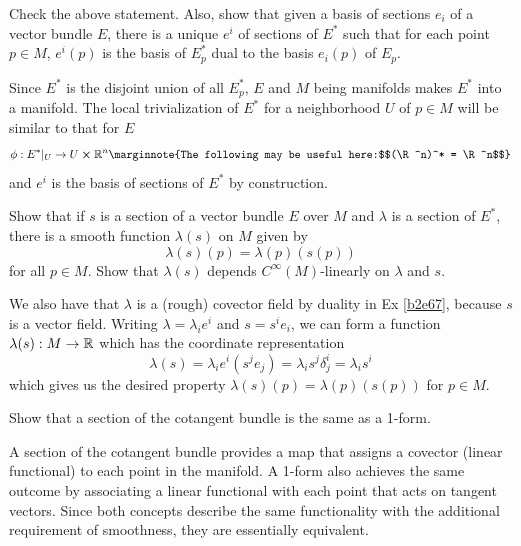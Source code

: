 \documentclass[10pt]{article}
\begin{document}
\begin{example}\label{b2e67}
	Check the above statement. Also, show that given a basis of sections $e_i$ of a vector bundle $E$, there is a unique  $e^i$ of sections of $E^*$ such that for each point $p \in M$, $e^i(p)$ is the basis of $E^*_p$ dual to the basis $e_i(p)$ of $E_p$.
\end{example}
\sol Since $E^*$ is the disjoint union of all $E_p^*$, $E$ and $M$ being manifolds makes $E^*$ into a manifold. The local trivialization of $E^*$ for a neighborhood $U$ of $p \in M$ will be similar to that for $E$
$$
\phi:E^*|_U \to U \cross \R^n\marginnote{The following may be useful here:$$(\R^n)^* = \R^n$$}
$$
and $e^i$ is the basis of sections of $E^*$ by construction.


\begin{example}
	Show that if $s$ is a section of a vector bundle $E$ over $M$ and $\lambda$ is a section of $E^*$, there is a smooth function $\lambda(s)$ on $M$ given by
	$$
	\lambda(s)(p) = \lambda(p)(s(p))
	$$
	for all $p\in M$. Show that $\lambda(s)$ depends $C^\infty(M)$-linearly on $\lambda$ and $s$.
\end{example}
\sol We also have that $\lambda$ is a (rough) covector field by duality in Ex \ref{b2e67}, because $s$ is a vector field. Writing $\lambda=\lambda_ie^i$ and $s=s^ie_i$, we can form a function $\lambda(s): M \to \mathbb{R}$ which has the coordinate representation
$$
\lambda(s) = \lambda_ie^i(s^je_j) = \lambda_is^j\delta_j^i = \lambda_is^i
$$
which gives us the desired property $\lambda(s)(p) = \lambda(p)(s(p))$ for $p\in M$.


\begin{example}
	Show that a section of the cotangent bundle is the same as a 1-form.
\end{example}
\sol A section of the cotangent bundle provides a map that assigns a covector (linear functional) to each point in the manifold. A 1-form also achieves the same outcome by associating a linear functional with each point that acts on tangent vectors. Since both concepts describe the same functionality with the additional requirement of smoothness, they are essentially equivalent.
\end{document}
